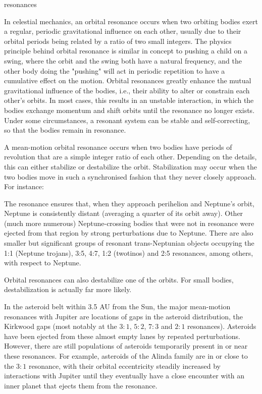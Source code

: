 \begin{wordonframe}{resonances}

In celestial mechanics, an orbital resonance occurs when two orbiting bodies exert a regular, periodic gravitational influence on each other, usually due to their orbital periods being related by a ratio of two small integers. The physics principle behind orbital resonance is similar in concept to pushing a child on a swing, where the orbit and the swing both have a natural frequency, and the other body doing the "pushing" will act in periodic repetition to have a cumulative effect on the motion. Orbital resonances greatly enhance the mutual gravitational influence of the bodies, i.e., their ability to alter or constrain each other's orbits. In most cases, this results in an unstable interaction, in which the bodies exchange momentum and shift orbits until the resonance no longer exists. Under some circumstances, a resonant system can be stable and self-correcting, so that the bodies remain in resonance.

A mean-motion orbital resonance occurs when two bodies have periods of revolution that are a simple integer ratio of each other. Depending on the details, this can either stabilize or destabilize the orbit. Stabilization may occur when the two bodies move in such a synchronised fashion that they never closely approach. For instance:

The resonance ensures that, when they approach perihelion and Neptune's orbit, Neptune is consistently distant (averaging a quarter of its orbit away). Other (much more numerous) Neptune-crossing bodies that were not in resonance were ejected from that region by strong perturbations due to Neptune. There are also smaller but significant groups of resonant trans-Neptunian objects occupying the 1:1 (Neptune trojans), 3:5, 4:7, 1:2 (twotinos) and 2:5 resonances, among others, with respect to Neptune.

Orbital resonances can also destabilize one of the orbits. For small bodies, destabilization is actually far more likely.

In the asteroid belt within 3.5 AU from the Sun, the major mean-motion resonances with Jupiter are locations of gaps in the asteroid distribution, the Kirkwood gaps (most notably at the $3:1$, $5:2$, $7:3$ and $2:1$ resonances). Asteroids have been ejected from these almost empty lanes by repeated perturbations. However, there are still populations of asteroids temporarily present in or near these resonances. For example, asteroids of the Alinda family are in or close to the $3:1$ resonance, with their orbital eccentricity steadily increased by interactions with Jupiter until they eventually have a close encounter with an inner planet that ejects them from the resonance.


\end{wordonframe}
